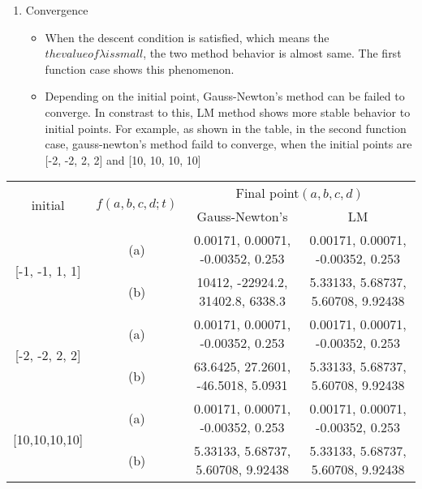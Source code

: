 \documentclass{standalone}
\begin{document}
\begin{enumerate}
  \item Convergence
  \begin{itemize}
    \item When the descent condition is satisfied, which means the $the value of \lambda is small$, the two method behavior is almost same. 
    The first function case shows this phenomenon.
    \item Depending on the initial point, Gauss-Newton's method can be failed to converge. 
    In constrast to this, LM method shows more stable behavior to initial points.
    For example, as shown in the table, in the second function case, 
    gauss-newton's method faild to converge, when the initial points are [-2, -2, 2, 2] and [10, 10, 10, 10]
  \end{itemize}
\end{enumerate}
\begin{center}
  \begin{tabular}{| c | c | c | c } \hline
  \multirow{2}{*}{initial} & \multirow{2}{*}{$f(a,b,c,d;t)$}   & \multicolumn{2}{c|}{Final point$(a, b, c, d)$} \\ \cline{3-4}
                                  &                              & Gauss-Newton's                    & LM \\ \hline
  \multirow{2}{*}{[-1, -1, 1, 1]}   & (a)                        & 0.00171, 0.00071, -0.00352, 0.253 & 0.00171, 0.00071, -0.00352, 0.253  \\
                                    & (b)                        & 10412, -22924.2, 31402.8, 6338.3  & 5.33133, 5.68737, 5.60708, 9.92438 \\ \hline
  \multirow{2}{*}{[-2, -2, 2, 2]}   & (a)                        & 0.00171, 0.00071, -0.00352, 0.253 & 0.00171, 0.00071, -0.00352, 0.253  \\ 
                                    & (b)                        & 63.6425, 27.2601, -46.5018, 5.0931 & 5.33133, 5.68737, 5.60708, 9.92438 \\ \hline
  \multirow{2}{*}{[10,10,10,10]} & (a)                        & 0.00171, 0.00071, -0.00352, 0.253  & 0.00171, 0.00071, -0.00352, 0.253  \\ 
                                    & (b)                        & 5.33133, 5.68737, 5.60708, 9.92438 & 5.33133, 5.68737, 5.60708, 9.92438 \\ \hline
  \end{tabular}
\end{center}
\end{document}
